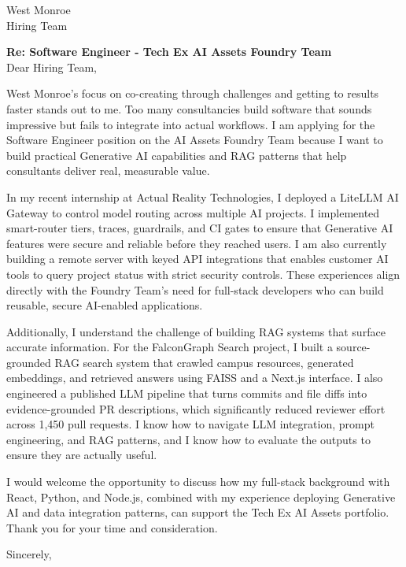 \documentclass[11pt]{letter}
\begin{document}
\begin{letter}{West Monroe \\ Hiring Team}
\opening{\textbf{Re: Software Engineer - Tech Ex AI Assets Foundry Team}\\ \vspace{1em} Dear Hiring Team,}

West Monroe's focus on co-creating through challenges and getting to results faster stands out to me. Too many consultancies build software that sounds impressive but fails to integrate into actual workflows. I am applying for the Software Engineer position on the AI Assets Foundry Team because I want to build practical Generative AI capabilities and RAG patterns that help consultants deliver real, measurable value.

In my recent internship at Actual Reality Technologies, I deployed a LiteLLM AI Gateway to control model routing across multiple AI projects. I implemented smart-router tiers, traces, guardrails, and CI gates to ensure that Generative AI features were secure and reliable before they reached users. I am also currently building a remote server with keyed API integrations that enables customer AI tools to query project status with strict security controls. These experiences align directly with the Foundry Team's need for full-stack developers who can build reusable, secure AI-enabled applications.

Additionally, I understand the challenge of building RAG systems that surface accurate information. For the FalconGraph Search project, I built a source-grounded RAG search system that crawled campus resources, generated embeddings, and retrieved answers using FAISS and a Next.js interface. I also engineered a published LLM pipeline that turns commits and file diffs into evidence-grounded PR descriptions, which significantly reduced reviewer effort across 1,450 pull requests. I know how to navigate LLM integration, prompt engineering, and RAG patterns, and I know how to evaluate the outputs to ensure they are actually useful.

I would welcome the opportunity to discuss how my full-stack background with React, Python, and Node.js, combined with my experience deploying Generative AI and data integration patterns, can support the Tech Ex AI Assets portfolio. Thank you for your time and consideration.

\closing{Sincerely,}

\end{letter}
\end{document}
